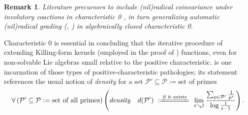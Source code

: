 \documentclass[11pt,leqno]{article}
\theoremstyle{plain}
\theoremstyle{plain}
\theoremstyle{plain}
\newtheorem{remark}[lemma]{Remark}
\numberwithin{equation}{section}
\theoremstyle{nonumberplain}
\newcommand\cP{{\mathcal P}}
\newcommand\1{{\bf 1}}
\begin{document}
\begin{remark}\label{re:lie.rad.inv.char0}
  Literature precursors to  include (nil)radical coinvariance under involutory coactions in characteristic 0 \cite[Theorem 4.1]{MR3514537}, in turn generalizing automatic (nil)radical grading (\cite[Corollary 4.3]{MR3115171}, \cite[Proposition 3.3]{MR3116786}) in algebraically closed characteristic 0.
\end{remark}

Characteristic 0 is essential in concluding that the iterative procedure of extending Killing-form kernels (employed in the proof of ) functions, even for non-solvable Lie algebras small relative to the positive characteristic.  is one incarnation of those types of positive-characteristic pathologies; its statement references the usual \cite[\S VI.4.1]{ser_arith_1973} notion of \emph{density} for a set $\cP'\subseteq \cP:=\text{set of primes}$
\begin{equation*}
  \forall\left(\cP'\subseteq \cP:=\text{set of all primes}\right)
  \left(
    \text{\emph{density}}\quad d(\cP')
    \ 
    :\xlongequal{\text{if it exists}}
    \ 
    \lim_{s\searrow 1}\frac{\sum_{p\in \cP'}\frac 1{p^s}}{\log \frac 1{s-1}}
  \right).
\end{equation*}
\end{document}
